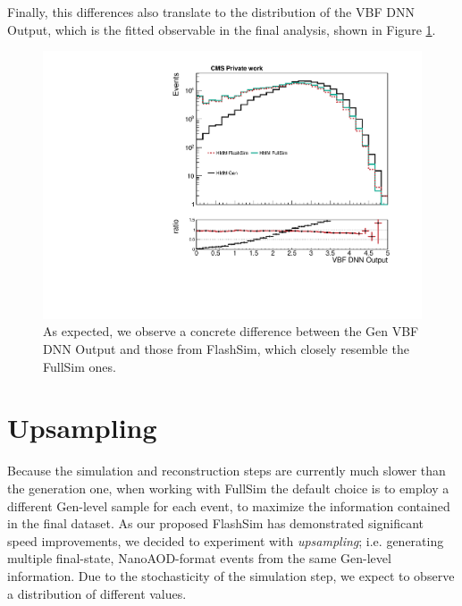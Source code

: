   Finally, this differences also translate to the distribution of the VBF DNN Output, which is the fitted observable in the final analysis, shown in Figure \ref{fig:dnngen}.
  
  \begin{figure}
    \centering
    \includegraphics[width=\linewidth]{gfx/ch6/gen_vs_flash_DNN18Atan_noqgl___PreSel_log.pdf}
    \caption[Gen vs FlashSim for VBF DNN]{As expected, we observe a concrete difference between the Gen VBF DNN Output and those from FlashSim, which closely resemble the FullSim ones.}
    \label{fig:dnngen}
   \end{figure}
   
\section{Upsampling}
  Because the simulation and reconstruction steps are currently much slower than the generation one, when working with FullSim the default choice is to employ a different Gen-level sample for each event, to maximize the information contained in the final dataset. As our proposed FlashSim has demonstrated significant speed improvements, we decided to experiment with \emph{upsampling}; i.e. generating multiple final-state, NanoAOD-format events from the same Gen-level information. Due to the stochasticity of the simulation step, we expect to observe a distribution of different values. 
  

